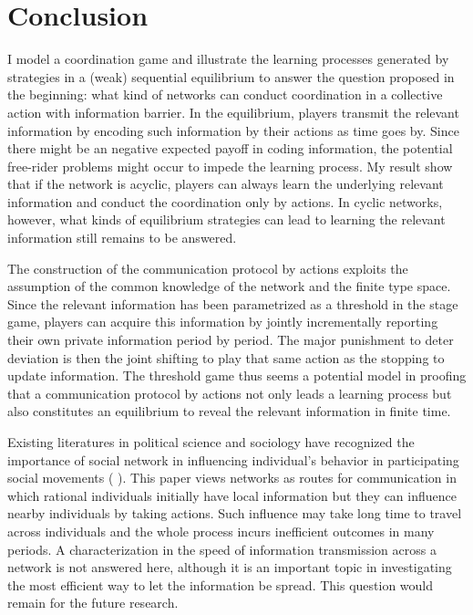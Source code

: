 \documentclass[12pt,letter]{article}
\theoremstyle{definition}
\theoremstyle{remark}
\theoremstyle{claim}
\begin{document}
\section{Conclusion}
\label{sec:con}
I model a coordination game and illustrate the learning processes generated by strategies in a (weak) sequential equilibrium to answer the question proposed in the beginning: what kind of networks can conduct coordination in a collective action with information barrier. In the equilibrium, players transmit the relevant information by encoding such information by their actions as time goes by. Since there might be an negative expected payoff in coding information, the potential free-rider problems might occur to impede the learning process. My result show that if the network is acyclic, players can always learn the underlying relevant information and conduct the coordination only by actions. In cyclic networks, however, what kinds of equilibrium strategies can lead to learning the relevant information still remains to be answered.


The construction of the communication protocol by actions exploits the assumption of the common knowledge of the network and the finite type space. Since the relevant information has been parametrized as a threshold in the stage game, players can acquire this information by jointly incrementally reporting their own private information period by period. The major punishment to deter deviation is then the joint shifting to play that same action as the stopping to update information. The threshold game thus seems a potential model in proofing that a communication protocol by actions not only leads a learning process but also constitutes an equilibrium to reveal the relevant information in finite time.

Existing literatures in political science and sociology have recognized the importance of social network in influencing individual's behavior in participating social movements ( \citep{Passy2003}\citep{McAdam2003}\citep{Siegel2009}). This paper views networks as routes for communication in which rational individuals initially have local information but they can influence nearby individuals by taking actions. Such influence may take long time to travel across individuals and the whole process incurs inefficient outcomes in many periods. A characterization in the speed of information transmission across a network is not answered here, although it is an important topic in investigating the most efficient way to let the information be spread. This question would remain for the future research.
\end{document}
